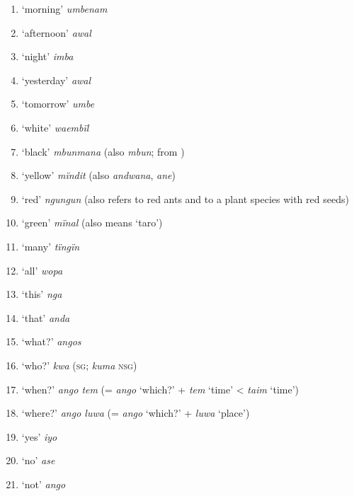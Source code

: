 \begin{enumerate}[noitemsep, label={\arabic*}, align=left, widest=190, labelsep=1ex,leftmargin=*]
\item  ‘morning’ \textit{umbenam}

\item  ‘afternoon’ \textit{awal}

\item  ‘night’ \textit{imba}

\item  ‘yesterday’ \textit{awal}

\item  ‘tomorrow’ \textit{umbe}

\item  ‘white’ \textit{waembïl}

\item  ‘black’ \textit{mbunmana} (also \textit{mbun};  from )

\item  ‘yellow’ \textit{mïndit} (also \textit{andwana}, \textit{ane})

\item  ‘red’ \textit{ngungun} (also refers to red ants and to a plant species with red seeds)

\item  ‘green’ \textit{mïnal} (also means ‘taro’)

\item  ‘many’ \textit{tïngïn}

\item  ‘all’ \textit{wopa}

\item  ‘this’ \textit{nga}

\item  ‘that’ \textit{anda}

\item  ‘what?’ \textit{angos}

\item  ‘who?’ \textit{kwa} (\textsc{sg;} \textit{kuma} \textsc{nsg)}

\item  ‘when?’ \textit{ango tem} (= \textit{ango} ‘which?’ + \textit{tem} ‘time’ <  \textit{taim} ‘time’)

\item  ‘where?’ \textit{ango luwa} (= \textit{ango} ‘which?’ + \textit{luwa} ‘place’)

\item  ‘yes’ \textit{iyo}

\item  ‘no’ \textit{ase}

\item  ‘not’ \textit{ango}


\end{enumerate}
